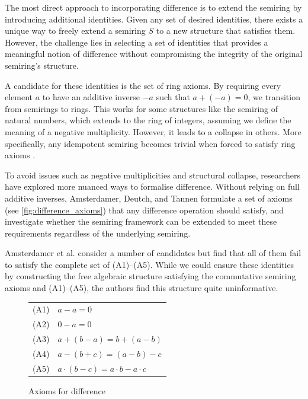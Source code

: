 \documentclass[oneside, 11pt]{amsbook}
\theoremstyle{plain}
\theoremstyle{definition}
\theoremstyle{remark}
\begin{document}
The most direct approach to incorporating difference is to extend the semiring by introducing additional identities. Given any set of desired identities, there exists a unique way to freely extend a semiring $S$ to a new structure that satisfies them. However, the challenge lies in selecting a set of identities that provides a meaningful notion of difference without compromising the integrity of the original semiring's structure.

A candidate for these identities is the set of ring axioms. By requiring every element $a$ to have an additive inverse $-a$ such that $a + (-a) = 0$, we transition from semirings to rings. This works for some structures like the semiring of natural numbers, which extends to the ring of integers, assuming we define the meaning of a negative multiplicity. However, it leads to a collapse in others. More specifically, any idempotent semiring becomes trivial when forced to satisfy ring axioms \cite{Suciu2024}.

To avoid issues such as negative multiplicities and structural collapse, researchers have explored more nuanced ways to formalise difference. Without relying on full additive inverses, Amsterdamer, Deutch, and Tannen \cite{Amsterdamer2011a} formulate a set of axioms (see \autoref{fig:difference_axioms}) that any difference operation should satisfy, and investigate whether the semiring framework can be extended to meet these requirements regardless of the underlying semiring.

Amsterdamer et al. consider a number of candidates but find that all of them fail to satisfy the complete set of (A1)--(A5). While we could ensure these identities by constructing the free algebraic structure satisfying the commutative semiring axioms and (A1)--(A5), the authors find this structure quite uninformative.

\begin{figure}[htbp]
    \centering
    \begin{tabular}{ll}
        (A1) & $a - a = 0$                               \\
        (A2) & $0 - a = 0$                               \\
        (A3) & $a + (b - a) = b + (a - b)$               \\
        (A4) & $a - (b + c) = (a - b) - c$               \\
        (A5) & $a \cdot (b - c) = a \cdot b - a \cdot c$ \\
    \end{tabular}
    \caption{Axioms for difference}
    \label{fig:difference_axioms}
\end{figure}
\end{document}
